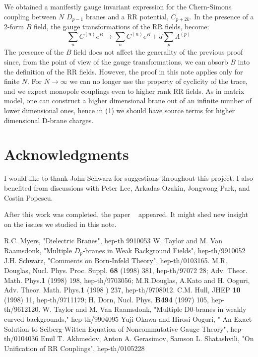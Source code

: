 \documentclass[a4paper,12pt]{article}
\begin{document}
    We obtained a manifestly gauge invariant expression for the Chern-Simons coupling between $N$ $D_{p-1}$ branes and a RR potential, $C_{p+2k}$. In the presence of a 2-form $B$ field, the gauge transformations of the RR fields, become:
\begin{equation}
\sum_n C^{(n)}e^B \rightarrow \sum_n C^{(n)}e^B + d\sum_p \Lambda^{(p)}
\end{equation}
The presence of the $B$ field does not affect the generality of the previous proof since, from the point of view of the gauge transformations,  we can absorb $B$ into the definition of the RR fields. However, the proof in this note applies only for finite $N$. For $N \rightarrow \infty$ we can no longer use the property of cyclicity of the trace, and we expect monopole couplings even to higher rank RR fields. As in  matrix model,  one can construct a higher dimensional brane  out of an infinite number of lower dimensional ones, hence in (1) we should have source terms for higher dimensional D-brane charges.  

\section{Acknowledgments}

 I would like to thank   John Schwarz for suggestions  throughout this project. I also benefited from discussions with  Peter Lee, Arkadas Ozakin, Jongwong Park, and Costin Popescu.
 
 After this work was completed, the paper ~\cite{emil} appeared. It  might shed new insight on the issues we studied in this note.  


\begin{thebibliography}{8}

 R.C. Myers, "Dielectric Branes", hep-th 9910053  
W. Taylor and M. Van Raamsdonk, "Multiple $D_p$-branes in Weak Background   Fields", hep-th/9910052 
 J.H. Schwarz, "Comments on Born-Infeld Theory", hep-th/0103165.
 M.R. Douglas, Nucl. Phys. Proc. Suppl. \textbf{68} (1998) 381, hep-th/97072    28; 
   Adv.     Theor. Math. Phys.\textbf{1} (1998) 198, hep-th/9703056; M.R.Douglas, A.Kato  and      H. Ooguri, 
 Adv. Theor. Math. Phys.\textbf{1} (1998     ) 237, hep-th/9708012. 
 C.M. Hull, JHEP \textbf{10} (1998) 11, hep-th/9711179; H. Dorn, Nucl. Phys. \textbf{B494} (1997) 105, hep-th/9612120. 
 W. Taylor and M. Van Raamsdonk, "Multiple D0-branes in weakly curved backgrounds," hep-th/9904095 
 Yuji Okawa and Hirosi Ooguri, " An Exact Solution to Seiberg-Witten Equation of Noncommutative Gauge Theory", hep-th/0104036 
  Emil T. Akhmedov, Anton A. Gerasimov, Samson L. Shatashvili, "On Unification of RR Couplings", hep-th/0105228
\end{thebibliography}
\end{document}
